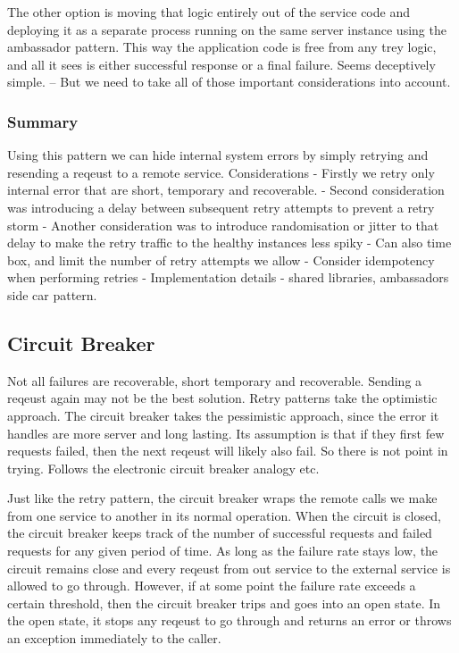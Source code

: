 The other option is moving that logic entirely out of the service code and deploying it as a separate process running on the same server instance using the ambassador pattern.
This way the application code is free from any trey logic, and all it sees is either successful response or a final failure.
Seems deceptively simple.
-- But we need to take all of those important considerations into account.

\subsubsection{Summary}
Using this pattern we can hide internal system errors by simply retrying and resending a reqeust to a remote service.
Considerations
- Firstly we retry only internal error that are short, temporary and recoverable.
- Second consideration was introducing a delay between subsequent retry attempts to prevent a retry storm
- Another consideration was to introduce randomisation or jitter to that delay to make the retry traffic to the healthy instances less spiky
- Can also time box, and limit the number of retry attempts we allow
- Consider idempotency when performing retries
- Implementation details - shared libraries, ambassadors side car pattern.

\subsection{Circuit Breaker}
Not all failures are recoverable, short temporary and recoverable.
Sending a reqeust again may not be the best solution.
Retry patterns take the optimistic approach.
The circuit breaker takes the pessimistic approach, since the error it handles are more server and long lasting.
Its assumption is that if they first few requests failed, then the next reqeust will likely also fail.
So there is not point in trying.
Follows the electronic circuit breaker analogy etc.

Just like the retry pattern, the circuit breaker wraps the remote calls we make from one service to another in its normal operation.
When the circuit is closed, the circuit breaker keeps track of the number of successful requests and failed requests for any given period of time.
As long as the failure rate stays low, the circuit remains close and every reqeust from out service to the external service is allowed to go through.
However, if at some point the failure rate exceeds a certain threshold, then the circuit breaker trips and goes into an open state.
In the open state, it stops any reqeust to go through and returns an error or throws an exception immediately to the caller.

